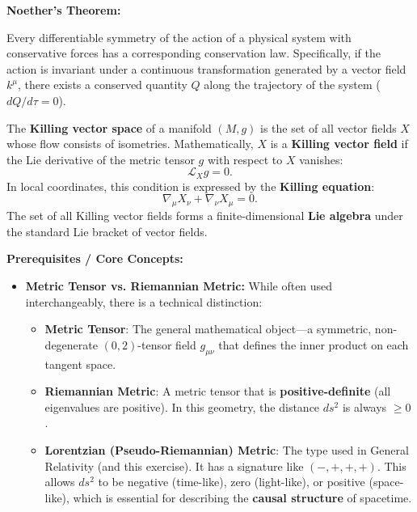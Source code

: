 \begin{solution}
\textbf{Noether's Theorem:}
\begin{theorem}
Every differentiable symmetry of the action of a physical system with conservative forces has a corresponding conservation law. Specifically, if the action is invariant under a continuous transformation generated by a vector field $k^\mu$, there exists a conserved quantity $Q$ along the trajectory of the system ($dQ/d\tau = 0$).
\end{theorem}

\begin{definition}
The \textbf{Killing vector space} of a manifold $(M, g)$ is the set of all vector fields $X$ whose flow consists of isometries. Mathematically, $X$ is a \textbf{Killing vector field} if the Lie derivative of the metric tensor $g$ with respect to $X$ vanishes:
\[ \mathcal{L}_X g = 0. \]
In local coordinates, this condition is expressed by the \textbf{Killing equation}:
\[ \nabla_\mu X_\nu + \nabla_\nu X_\mu = 0. \]
The set of all Killing vector fields forms a finite-dimensional \textbf{Lie algebra} under the standard Lie bracket of vector fields.
\end{definition}

\textbf{Prerequisites / Core Concepts:}
\begin{itemize}
    \item \textbf{Metric Tensor vs. Riemannian Metric:}
    While often used interchangeably, there is a technical distinction:
    \begin{itemize}
        \item \textbf{Metric Tensor}: The general mathematical object—a symmetric, non-degenerate $(0,2)$-tensor field $g_{\mu\nu}$ that defines the inner product on each tangent space.
        \item \textbf{Riemannian Metric}: A metric tensor that is \textbf{positive-definite} (all eigenvalues are positive). In this geometry, the distance $ds^2$ is always $\geq 0$.
        \item \textbf{Lorentzian (Pseudo-Riemannian) Metric}: The type used in General Relativity (and this exercise). It has a signature like $(-,+,+,+)$. This allows $ds^2$ to be negative (time-like), zero (light-like), or positive (space-like), which is essential for describing the \textbf{causal structure} of spacetime.
    \end{itemize}


\end{itemize}
\end{solution}
